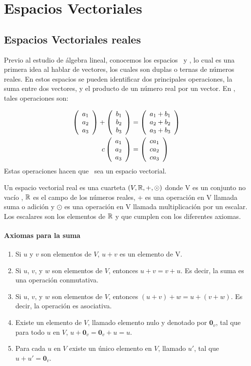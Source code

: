 
\chapter{Espacios Vectoriales}


\section{Espacios Vectoriales reales}
Previo al estudio de álgebra lineal, conocemos los espacios \rdos\ y \rtres, lo cual es una primera idea al hablar de vectores, los cuales son duplas o ternas de números reales. En estos espacios se pueden identificar dos principales operaciones, la suma entre dos vectores, y el producto de un número real por un vector. En \rtres, tales operaciones son:

\begin{align*}
\left( \begin{array}{r} a_1\\ a_2\\ a_3 \end{array} \right) +\left( \begin{array}{r} b_1\\ b_2\\ b_3 \end{array} \right) &=\left( \begin{array}{r} a_1+b_1\\ a_2+b_2\\ a_3+b_3 \end{array} \right) \\
c\left( \begin{array}{r} a_1\\ a_2\\ a_3 \end{array} \right) &=\left( \begin{array}{r} ca_1\\ ca_2\\ ca_3 \end{array} \right) 
\end{align*}
Estas operaciones hacen que \rtres\ sea un espacio vectorial. 
\begin{dfn}
Un espacio vectorial real es una cuarteta $(V, \mathbb{R}, +, \odot)$ donde V es un conjunto no vacío , $\mathbb{R}$ es el campo de los números reales, + es una operación en V llamada suma o adición y $\odot$ es una operación en V llamada multiplicación por un escalar. Los escalares son los elementos de $\mathbb{R}$ y que cumplen con los diferentes axiomas. 


\end{dfn}
\subsubsection*{Axiomas para la suma}
\begin{enumerate}
\item Si $u$ y $v$ son elementos de $V$, $u+v$ es un elemento de V.
\item Si $u$, $v$, y $w$ son elementos de $V$, entonces $u+v=v+u$. Es decir, la suma es una operación conmutativa.
\item Si $u$, $v$, y $w$ son elementos de $V$, entonces  $(u+v)+w=u+(v+w)$. Es decir, la operación es asociativa.
\item Existe un elemento de $V$, llamado elemento nulo y denotado por $\mathbf{0}_v$, tal que para todo $u$ en $V$, $u + \mathbf{0}_v = \mathbf{0}_v +u = u$.
\item Para cada $u$ en $V$ existe un único elemento en $V$, llamado $u'$, tal que $u+u'=\mathbf{0}_v$.
\end{enumerate}

